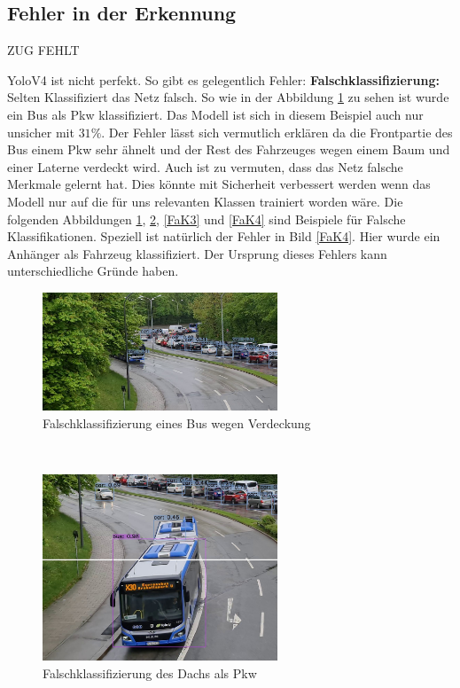 \documentclass[conference]{IEEEtran}
\begin{document}
	\subsection{Fehler in der Erkennung}
	 ZUG FEHLT
	
	YoloV4 ist nicht perfekt. So gibt es gelegentlich Fehler:
	\textbf{Falschklassifizierung:}\\
	Selten Klassifiziert das Netz falsch. So wie in der Abbildung \ref{FaK} zu sehen ist wurde ein Bus als Pkw klassifiziert. Das Modell ist sich in diesem Beispiel auch nur unsicher mit $31\%$. Der Fehler lässt sich vermutlich erklären da die Frontpartie des Bus einem Pkw sehr ähnelt und der Rest des Fahrzeuges wegen einem Baum und einer Laterne verdeckt wird. Auch ist zu vermuten, dass das Netz falsche Merkmale gelernt hat. Dies könnte mit Sicherheit verbessert werden wenn das Modell nur auf die für uns relevanten Klassen trainiert worden wäre. Die folgenden Abbildungen \ref{FaK}, \ref{FaK2}, \ref{FaK3} und \ref{FaK4} sind Beispiele für Falsche Klassifikationen. Speziell ist natürlich der Fehler in Bild \ref{FaK4}. Hier wurde ein Anhänger als Fahrzeug klassifiziert. Der Ursprung dieses Fehlers kann unterschiedliche Gründe haben.
	\begin{figure}[!h]
		\begin{center}
			\includegraphics[width=7cm]{Media/Output_480 - Kopie.jpg}
			\caption{Falschklassifizierung eines Bus wegen Verdeckung}
			\label{FaK}
		\end{center}
	\end{figure}\\
	\begin{figure}[!h]
		\begin{center}
			\includegraphics[width=7cm]{Media/Output_847 - Kopie.jpg}
			\caption{Falschklassifizierung des Dachs als Pkw}
			\label{FaK2}
		\end{center}
	\end{figure}\\
\end{document}
